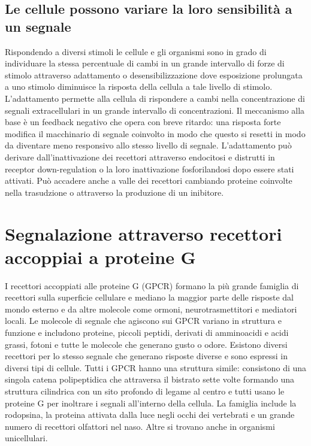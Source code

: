 \subsection{Le cellule possono variare la loro sensibilit\`a a un segnale}
Rispondendo a diversi stimoli le cellule e gli organismi sono in grado di individuare la stessa percentuale di cambi in un grande intervallo di forze di stimolo attraverso adattamento o 
desensibilizzazione dove esposizione prolungata a uno stimolo diminuisce la risposta della cellula a tale livello di stimolo. L'adattamento permette alla cellula di rispondere a cambi
nella concentrazione di segnali extracellulari in un grande intervallo di concentrazioni. Il meccanismo alla base \`e un feedback negativo che opera con breve ritardo: una risposta 
forte modifica il macchinario di segnale coinvolto in modo che questo si resetti in modo da diventare meno responsivo allo stesso livello di segnale. L'adattamento pu\`o derivare 
dall'inattivazione dei recettori attraverso endocitosi e distrutti in receptor down-regulation o la loro inattivazione fosforilandosi dopo essere stati attivati. Pu\`o accadere anche
a valle dei recettori cambiando proteine coinvolte nella trasudzione o attraverso la produzione di un inibitore. 
\section{Segnalazione attraverso recettori accoppiai a proteine G}
I recettori accoppiati alle proteine G (GPCR) formano la pi\`u grande famiglia di recettori sulla superficie cellulare e mediano la maggior parte delle risposte dal mondo esterno e da
altre molecole come ormoni, neurotrasmettitori e mediatori locali. Le molecole di segnale che agiscono sui GPCR variano in struttura e funzione e includono proteine, piccoli peptidi, 
derivati di amminoacidi e acidi grassi, fotoni e tutte le molecole che generano gusto o odore. Esistono diversi recettori per lo stesso segnale che generano risposte diverse e sono
espressi in diversi tipi di cellule. Tutti i GPCR hanno una struttura simile: consistono di una singola catena polipeptidica che attraversa il bistrato sette volte formando una 
struttura cilindrica con un sito profondo di legame al centro e tutti usano le proteine G per inoltrare i segnali all'interno della cellula. La famiglia include la rodopsina, la proteina
attivata dalla luce negli occhi dei vertebrati e un grande numero di recettori olfattori nel naso. Altre si trovano anche in organismi unicellulari. 

